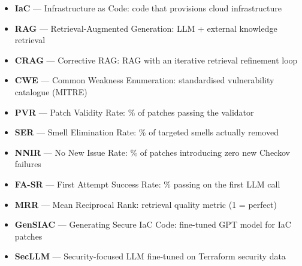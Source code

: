 \documentclass[12pt,a4paper]{article}
\begin{document}
\begin{itemize}[leftmargin=*]
  \item \textbf{IaC} --- Infrastructure as Code: code that provisions cloud infrastructure
  \item \textbf{RAG} --- Retrieval-Augmented Generation: LLM + external knowledge retrieval
  \item \textbf{CRAG} --- Corrective RAG: RAG with an iterative retrieval refinement loop
  \item \textbf{CWE} --- Common Weakness Enumeration: standardised vulnerability catalogue (MITRE)
  \item \textbf{PVR} --- Patch Validity Rate: \% of patches passing the validator
  \item \textbf{SER} --- Smell Elimination Rate: \% of targeted smells actually removed
  \item \textbf{NNIR} --- No New Issue Rate: \% of patches introducing zero new Checkov failures
  \item \textbf{FA-SR} --- First Attempt Success Rate: \% passing on the first LLM call
  \item \textbf{MRR} --- Mean Reciprocal Rank: retrieval quality metric (1 = perfect)
  \item \textbf{GenSIAC} --- Generating Secure IaC Code: fine-tuned GPT model for IaC patches
  \item \textbf{SecLLM} --- Security-focused LLM fine-tuned on Terraform security data
\end{itemize}
\end{document}
